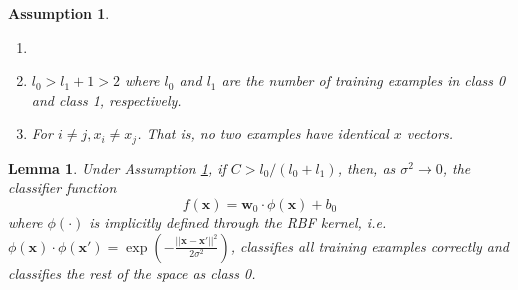 \documentclass[12pt]{article}
\newtheorem{lemma}{Lemma}
\newtheorem{assumption}{Assumption}
\theoremstyle{definition}
\begin{document}
\begin{assumption}\label{ass1}
\begin{enumerate}
    \item[]
    \item $l_0>l_1+1>2$ where $l_0$ and $l_1$ are the number of training examples in class 0 and class 1, respectively.
    \item For $i\neq j, x_i\neq x_j$. That is, no two examples have identical $x$ vectors.
\end{enumerate}
\end{assumption}

\begin{lemma}\label{perfect_fit}
Under Assumption \ref{ass1}, if $C>l_0/(l_0+l_1)$, then, as $\sigma^2\to0$, the classifier function 
$$f(\mathbf{x})=\mathbf{w}_0\cdot\phi(\mathbf{x})+b_0$$ 
where $\phi(\cdot)$ is implicitly defined through the RBF kernel, i.e. $\phi(\mathbf{x})\cdot\phi(\mathbf{x}')=\exp\left(-\frac{||\mathbf{x}-\mathbf{x}'||^2}{2\sigma^2}\right)$, classifies all training examples correctly and classifies the rest of the space as class 0.
\end{lemma}
\end{document}

